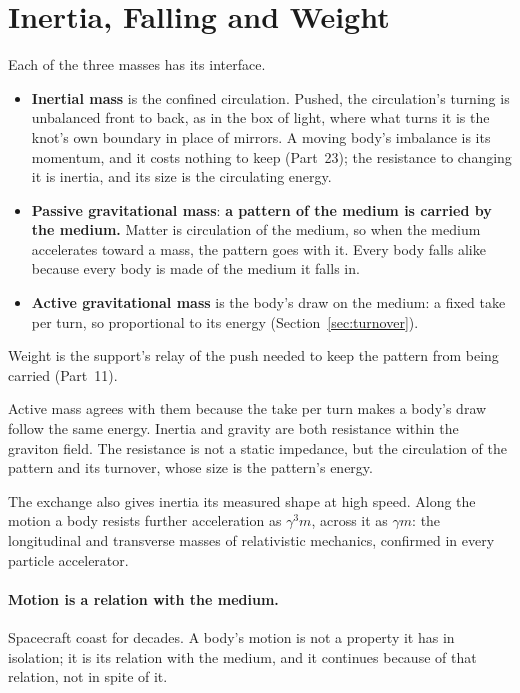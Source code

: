 \documentclass[11pt,a4paper]{article}
\begin{document}
\section{Inertia, Falling and Weight}
\label{sec:inertia}

\begin{hypbar}
Each of the three masses has its interface.
\begin{itemize}
\item \textbf{Inertial mass} is the confined circulation. Pushed, the circulation's turning is unbalanced front to back, as in the box of light, where what turns it is the knot's own boundary in place of mirrors. A moving body's imbalance is its momentum, and it costs nothing to keep (Part~23); the resistance to changing it is inertia, and its size is the circulating energy.
\item \textbf{Passive gravitational mass}: \textbf{a pattern of the medium is carried by the medium.} Matter is circulation of the medium, so when the medium accelerates toward a mass, the pattern goes with it. Every body falls alike because every body is made of the medium it falls in.
\item \textbf{Active gravitational mass} is the body's draw on the medium: a fixed take per turn, so proportional to its energy (Section~\ref{sec:turnover}).
\end{itemize}
Weight is the support's relay of the push needed to keep the pattern from being carried (Part~11).
\end{hypbar}

 Active mass agrees with them because the take per turn makes a body's draw follow the same energy. Inertia and gravity are both resistance within the graviton field. The resistance is not a static impedance, but the circulation of the pattern and its turnover, whose size is the pattern's energy.

The exchange also gives inertia its measured shape at high speed. Along the motion a body resists further acceleration as $\gamma^3 m$, across it as $\gamma m$: the longitudinal and transverse masses of relativistic mechanics, confirmed in every particle accelerator.

\paragraph{Motion is a relation with the medium.} Spacecraft coast for decades. A body's motion is not a property it has in isolation; it is its relation with the medium, and it continues because of that relation, not in spite of it.
\end{document}
